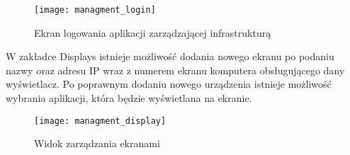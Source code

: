 \begin{figure}
\begin{center}
    \texttt{[image: managment\_login]}
\end{center}
\caption{Ekran logowania aplikacji zarządzającej infrastrukturą}
\label{fig:managment_login}
\end{figure}

W zakładce Displays istnieje możliwość dodania nowego ekranu po podaniu nazwy oraz adresu IP wraz z numerem ekranu komputera obsługującego dany wyświetlacz. Po poprawnym dodaniu nowego urządzenia istnieje możliwość wybrania aplikacji, która będzie wyświetlana na ekranie.

\begin{figure}
\begin{center}
	\texttt{[image: managment\_display]}
\end{center}
\caption{Widok zarządzania ekranami}
\label{fig:managment_display}
\end{figure}





